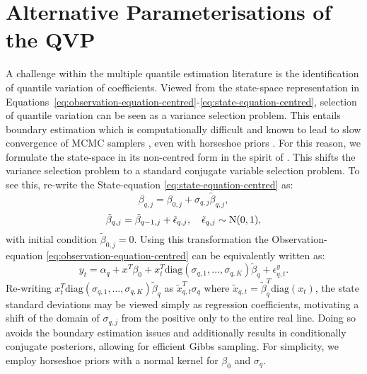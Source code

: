 \section{Alternative Parameterisations of the QVP}\label{sec:alt-parameterisation}
%
A challenge within the multiple quantile estimation literature is the identification of quantile variation of coefficients. Viewed from the state-space representation in Equations~\ref{eq:observation-equation-centred}-\ref{eq:state-equation-centred}, selection of quantile variation can be seen as a variance selection problem. This entails boundary estimation which is computationally difficult and known to lead to slow convergence of $\mathrm{MCMC}$ samplers \citep{fruhwirth2010stochastic}, even with horseshoe priors \citep{bitto2019achieving}. For this reason, we formulate the state-space in its non-centred form in the spirit of \citet{fruhwirth2010stochastic}. This shifts the variance selection problem to a standard conjugate variable selection problem. To see this, re-write the State-equation \ref{eq:state-equation-centred} as:
%
\begin{equation}
    \beta_{q,j} = \beta_{0,j} + \sigma_{q,j}\tilde{\beta}_{q,j},
\end{equation}
%
%
\begin{equation}
    \tilde{\beta}_{q,j} = \tilde{\beta}_{q-1,j} + \tilde{\epsilon}_{q,j}, \quad \tilde{\epsilon}_{q,j} \sim \mathrm{N}(0,1),
\end{equation}
%
with initial condition $\tilde{\beta}_{0,j} = 0$. Using this transformation the Observation-equation \ref{eq:observation-equation-centred} can be equivalently written as:
%
\begin{equation} \label{eq:NC_model}
 y_{t} = \alpha_q + x^{T}\beta_0 + x^{T}_t\text{diag}(\sigma_{q,1},\dotsc,\sigma_{q,K})\tilde{\beta}_q + \epsilon^y_{q,t}.   
\end{equation}
%
Re-writing $x^{T}_t\text{diag}(\sigma_{q,1},\dotsc,\sigma_{q,K})\tilde{\beta}_q$ as $\tilde{x}_{q,t}^{T}\sigma_q$ where $\tilde{x}_{q,t} = \tilde{\beta}_q^{T}\text{diag}(x_t)$, the state standard deviations may be viewed simply as regression coefficients, motivating a shift of the domain of $\sigma_{q,j}$ from the positive only to the entire real line. %
Doing so avoids the boundary estimation issues and additionally results in conditionally conjugate posteriors, allowing for efficient Gibbs sampling.
%
For simplicity, we employ horseshoe priors with a normal kernel for $\beta_0$ and $\sigma_q$. 
